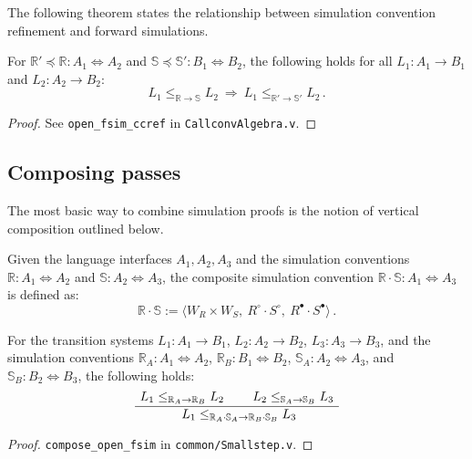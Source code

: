 \documentclass[sigplan,10pt,review,anonymous]{acmart}
\newcommand{\que}{\circ}
\newcommand{\ans}{\bullet}
\newcommand{\scref}{\preceq}
\begin{document}
The following theorem states the relationship between
simulation convention refinement and forward simulations.

\begin{theorem} %
For
$\mathbb{R}' \scref \mathbb{R} : A_1 \Leftrightarrow A_2$ and
$\mathbb{S} \scref \mathbb{S}' : B_1 \Leftrightarrow B_2$,
the following holds for all
$L_1 : A_1 \rightarrow B_1$ and $L_2 : A_2 \rightarrow B_2$:
\[
      L_1 \le_{\mathbb{R} \rightarrow \mathbb{S}} L_2
      \: \Rightarrow \:
      L_1 \le_{\mathbb{R}' \rightarrow \mathbb{S}'} L_2 \,.
\]
\begin{proof}
See \texttt{open\_fsim\_ccref} in \texttt{CallconvAlgebra.v}.
\end{proof}
\end{theorem}


\subsection{Composing passes} %

The most basic way to combine simulation proofs
is the notion of vertical composition outlined below.

\begin{definition} %
Given the language interfaces $A_1, A_2, A_3$
and the simulation conventions
$\mathbb{R} : A_1 \Leftrightarrow A_2$ and
$\mathbb{S} : A_2 \Leftrightarrow A_3$,
the composite simulation convention
$\mathbb{R} \cdot \mathbb{S} : A_1 \Leftrightarrow A_3$ is defined as:
\[
    \mathbb{R} \cdot \mathbb{S} :=
      \langle
        W_R \times W_S, \:
        R^\que \cdot S^\que, \:
        R^\ans \cdot S^\ans
      \rangle \,.
\]
\end{definition}

\begin{theorem} \label{thm:simcomp} %
For the transition systems
$L_1 : A_1 \rightarrow B_1$,
$L_2 : A_2 \rightarrow B_2$,
$L_3 : A_3 \rightarrow B_3$,
and the simulation conventions
$\mathbb{R}_A : A_1 \Leftrightarrow A_2$,
$\mathbb{R}_B : B_1 \Leftrightarrow B_2$,
$\mathbb{S}_A : A_2 \Leftrightarrow A_3$, and
$\mathbb{S}_B : B_2 \Leftrightarrow B_3$,
the following holds:
\[
  \AxiomC{$L_1 \le_{\mathbb{R}_A \rightarrow \mathbb{R}_B} L_2$}
  \AxiomC{$L_2 \le_{\mathbb{S}_A \rightarrow \mathbb{S}_B} L_3$}
  \BinaryInfC{
    $L_1 \le_{\mathbb{R}_A \cdot \mathbb{S}_A \rightarrow
                   \mathbb{R}_B \cdot \mathbb{S}_B} L_3$}
  \DisplayProof
\]
\begin{proof}
\texttt{compose\_open\_fsim} in \texttt{common/Smallstep.v}.
\end{proof}
\end{theorem}
\end{document}
